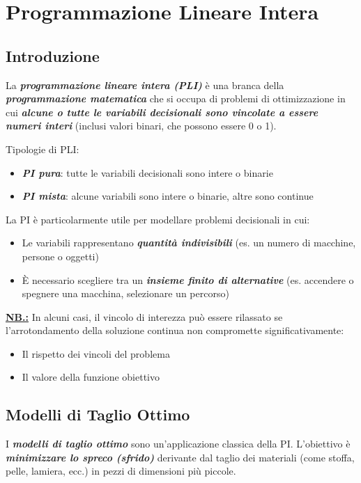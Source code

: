 \section{Programmazione Lineare Intera}

\subsection{Introduzione}
La \textbf{\textit{programmazione lineare intera (PLI)}} è una branca della \textbf{\textit{programmazione matematica}} che si occupa di problemi di ottimizzazione in cui 
\textbf{\textit{alcune o tutte le variabili decisionali sono vincolate a essere numeri interi}} (inclusi valori binari, che possono essere 0 o 1).

Tipologie di PLI:
\begin{itemize}
    \item \textbf{\textit{PI pura}}: tutte le variabili decisionali sono intere o binarie
    \item \textbf{\textit{PI mista}}: alcune variabili sono intere o binarie, altre sono continue
\end{itemize}

La PI è particolarmente utile per modellare problemi decisionali in cui:
\begin{itemize}
    \item Le variabili rappresentano \textbf{\textit{quantità indivisibili}} (es. un numero di macchine, persone o oggetti)
    \item È necessario scegliere tra un \textbf{\textit{insieme finito di alternative}} (es. accendere o spegnere una macchina, selezionare un percorso)
\end{itemize}

\underline{\textbf{NB.:}} In alcuni casi, il vincolo di interezza può essere rilassato se 
l'arrotondamento della soluzione continua non compromette significativamente:
\begin{itemize}
    \item Il rispetto dei vincoli del problema
    \item Il valore della funzione obiettivo
\end{itemize}

\subsection{Modelli di Taglio Ottimo}
I \textbf{\textit{modelli di taglio ottimo}} sono un'applicazione classica della PI. 
L'obiettivo è \textbf{\textit{minimizzare lo spreco (sfrido)}} derivante dal taglio dei 
materiali (come stoffa, pelle, lamiera, ecc.) in pezzi di dimensioni più piccole.

